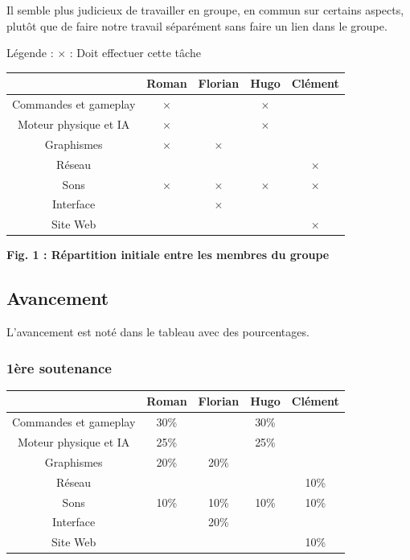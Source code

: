 \documentclass{article}
\begin{document}
\par
Il semble plus judicieux de travailler en groupe, en commun sur certains aspects, plutôt que de faire notre travail séparément sans faire un lien dans le groupe.
\newline

\par
Légende : $\times$ : Doit effectuer cette tâche

\begin{center}
\begin{tabular}{|c|c|c|c|c|}
\hline
 & Roman & Florian & Hugo & Clément \\
\hline
Commandes et gameplay & $\times$ & & $\times$ & \\
\hline
Moteur physique et IA & $\times$ & & $\times$ & \\
\hline
Graphismes & $\times$ & $\times$ & & \\
\hline
Réseau & & & & $\times$ \\
\hline
Sons & $\times$ & $\times$ & $\times$ & $\times$ \\
\hline
Interface & & $\times$ & & \\
\hline
Site Web & & & & $\times$ \\
\hline
\end{tabular}
\end{center}

\begin{center}
\bf{Fig. 1 : Répartition initiale entre les membres du groupe}
\end{center}



\newpage
\subsection{Avancement}

\par
L'avancement est noté dans le tableau avec des pourcentages.
\newline

\subsubsection{1ère soutenance}

\begin{center}
\begin{tabular}{|c|c|c|c|c|}
\hline
 & Roman & Florian & Hugo & Clément \\
\hline
Commandes et gameplay & 30\% & & 30\% & \\
\hline
Moteur physique et IA & 25\% & & 25\%  & \\
\hline
Graphismes & 20\% & 20\% & & \\
\hline
Réseau & & & & 10\% \\
\hline
Sons & 10\% & 10\% & 10\% & 10\% \\
\hline
Interface & & 20\% & & \\
\hline
Site Web & & & & 10\% \\
\hline
\end{tabular}
\end{center}
\end{document}

